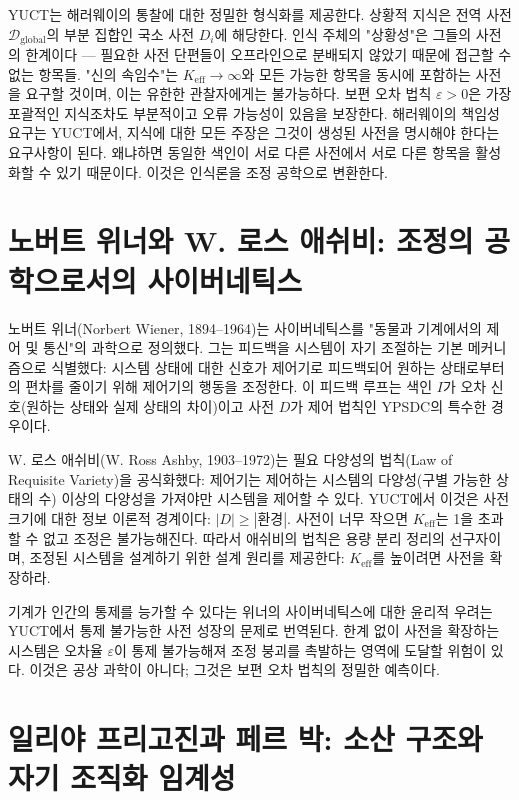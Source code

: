 \documentclass[12pt,a4paper]{article}
\begin{document}
	YUCT는 해러웨이의 통찰에 대한 정밀한 형식화를 제공한다. 상황적 지식은 전역 사전 \(\mathcal{D}_{\text{global}}\)의 부분 집합인 국소 사전 \(D_i\)에 해당한다. 인식 주체의 "상황성"은 그들의 사전의 한계이다 — 필요한 사전 단편들이 오프라인으로 분배되지 않았기 때문에 접근할 수 없는 항목들. "신의 속임수"는 \(K_{\mathrm{eff}} \to \infty\)와 모든 가능한 항목을 동시에 포함하는 사전을 요구할 것이며, 이는 유한한 관찰자에게는 불가능하다. 보편 오차 법칙 \(\varepsilon > 0\)은 가장 포괄적인 지식조차도 부분적이고 오류 가능성이 있음을 보장한다. 해러웨이의 책임성 요구는 YUCT에서, 지식에 대한 모든 주장은 그것이 생성된 사전을 명시해야 한다는 요구사항이 된다. 왜냐하면 동일한 색인이 서로 다른 사전에서 서로 다른 항목을 활성화할 수 있기 때문이다. 이것은 인식론을 조정 공학으로 변환한다.
	
	\section{노버트 위너와 W. 로스 애쉬비: 조정의 공학으로서의 사이버네틱스}
	
	노버트 위너(Norbert Wiener, 1894–1964)는 사이버네틱스를 "동물과 기계에서의 제어 및 통신"의 과학으로 정의했다. 그는 피드백을 시스템이 자기 조절하는 기본 메커니즘으로 식별했다: 시스템 상태에 대한 신호가 제어기로 피드백되어 원하는 상태로부터의 편차를 줄이기 위해 제어기의 행동을 조정한다. 이 피드백 루프는 색인 \(I\)가 오차 신호(원하는 상태와 실제 상태의 차이)이고 사전 \(D\)가 제어 법칙인 YPSDC의 특수한 경우이다.
	
	W. 로스 애쉬비(W. Ross Ashby, 1903–1972)는 필요 다양성의 법칙(Law of Requisite Variety)을 공식화했다: 제어기는 제어하는 시스템의 다양성(구별 가능한 상태의 수) 이상의 다양성을 가져야만 시스템을 제어할 수 있다. YUCT에서 이것은 사전 크기에 대한 정보 이론적 경계이다: \(|D| \ge |\text{환경}|\). 사전이 너무 작으면 \(K_{\mathrm{eff}}\)는 1을 초과할 수 없고 조정은 불가능해진다. 따라서 애쉬비의 법칙은 용량 분리 정리의 선구자이며, 조정된 시스템을 설계하기 위한 설계 원리를 제공한다: \(K_{\mathrm{eff}}\)를 높이려면 사전을 확장하라.
	
	기계가 인간의 통제를 능가할 수 있다는 위너의 사이버네틱스에 대한 윤리적 우려는 YUCT에서 통제 불가능한 사전 성장의 문제로 번역된다. 한계 없이 사전을 확장하는 시스템은 오차율 \(\varepsilon\)이 통제 불가능해져 조정 붕괴를 촉발하는 영역에 도달할 위험이 있다. 이것은 공상 과학이 아니다; 그것은 보편 오차 법칙의 정밀한 예측이다.
	
	\section{일리야 프리고진과 페르 박: 소산 구조와 자기 조직화 임계성}
	
\end{document}
